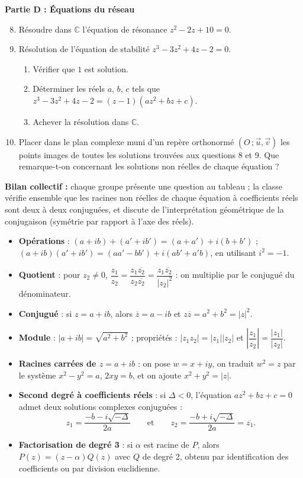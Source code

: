 \documentclass[11pt]{article}
\newcounter{popsec}
\newcounter{popsub}
\newcommand{\courssub}[1]{%
  \stepcounter{popsub}%
  \par\vspace{9pt}\noindent{\popxbold\fontsize{11.5}{13}\selectfont\color{popink}{\color{poporange}\thepopsec.\thepopsub}\hspace{6pt}#1}\par\nopagebreak\vspace{4pt}
}
\begin{document}
\textbf{Partie D : Équations du réseau}
\begin{enumerate}
\setcounter{enumi}{7}
\item Résoudre dans $\mathbb{C}$ l'équation de résonance $z^2 - 2z + 10 = 0$.
\item Résolution de l'équation de stabilité $z^3 - 3z^2 + 4z - 2 = 0$.
\begin{enumerate}
\item Vérifier que $1$ est solution.
\item Déterminer les réels $a$, $b$, $c$ tels que $z^3 - 3z^2 + 4z - 2 = (z - 1)(az^2 + bz + c)$.
\item Achever la résolution dans $\mathbb{C}$.
\end{enumerate}
\item Placer dans le plan complexe muni d'un repère orthonormé $(O\,;\vec{u},\vec{v})$ les points images de toutes les solutions trouvées aux questions 8 et 9. Que remarque-t-on concernant les solutions non réelles de chaque équation ?
\end{enumerate}

\textbf{Bilan collectif :} chaque groupe présente une question au tableau ; la classe vérifie ensemble que les racines non réelles de chaque équation à coefficients réels sont deux à deux conjuguées, et discute de l'interprétation géométrique de la conjugaison (symétrie par rapport à l'axe des réels).

\courssub{Ressources à mobiliser}

\begin{aretenir}
\begin{itemize}
\item \textbf{Opérations} : $(a+ib) + (a'+ib') = (a+a') + i(b+b')$ ; $(a+ib)(a'+ib') = (aa' - bb') + i(ab' + a'b)$, en utilisant $i^2 = -1$.
\item \textbf{Quotient} : pour $z_2 \neq 0$, $\dfrac{z_1}{z_2} = \dfrac{z_1 \overline{z_2}}{z_2 \overline{z_2}} = \dfrac{z_1 \overline{z_2}}{|z_2|^2}$ : on multiplie par le conjugué du dénominateur.
\item \textbf{Conjugué} : si $z = a + ib$, alors $\overline{z} = a - ib$ et $z\overline{z} = a^2 + b^2 = |z|^2$.
\item \textbf{Module} : $|a + ib| = \sqrt{a^2 + b^2}$ ; propriétés : $|z_1 z_2| = |z_1||z_2|$ et $\left|\dfrac{z_1}{z_2}\right| = \dfrac{|z_1|}{|z_2|}$.
\item \textbf{Racines carrées de $z = a+ib$} : on pose $w = x + iy$, on traduit $w^2 = z$ par le système $x^2 - y^2 = a$, $2xy = b$, et on ajoute $x^2 + y^2 = |z|$.
\item \textbf{Second degré à coefficients réels} : si $\Delta < 0$, l'équation $az^2 + bz + c = 0$ admet deux solutions complexes conjuguées :
\[ z_1 = \dfrac{-b - i\sqrt{-\Delta}}{2a} \qquad \text{et} \qquad z_2 = \dfrac{-b + i\sqrt{-\Delta}}{2a} = \overline{z_1}. \]
\item \textbf{Factorisation de degré 3} : si $\alpha$ est racine de $P$, alors $P(z) = (z - \alpha)Q(z)$ avec $Q$ de degré 2, obtenu par identification des coefficients ou par division euclidienne.
\end{itemize}
\end{aretenir}
\end{document}
